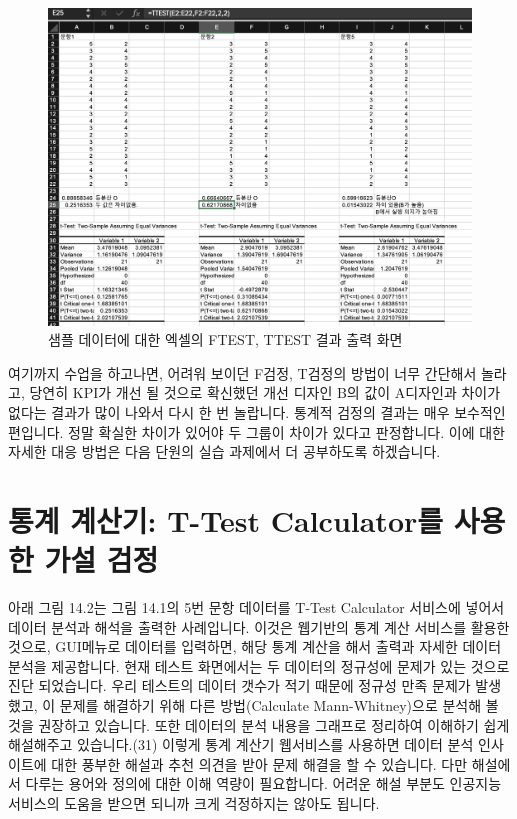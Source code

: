\documentclass[
  letterpaper,
]{book}
\begin{document}
\begin{figure}[H]

{\centering \includegraphics{img/fig28.png}

}

\caption{샘플 데이터에 대한 엑셀의 FTEST, TTEST 결과 출력 화면}

\end{figure}%

여기까지 수업을 하고나면, 어려워 보이던 F검정, T검정의 방법이 너무
간단해서 놀라고, 당연히 KPI가 개선 될 것으로 확신했던 개선 디자인 B의
값이 A디자인과 차이가 없다는 결과가 많이 나와서 다시 한 번 놀랍니다.
통계적 검정의 결과는 매우 보수적인 편입니다. 정말 확실한 차이가 있어야
두 그룹이 차이가 있다고 판정합니다. 이에 대한 자세한 대응 방법은 다음
단원의 실습 과제에서 더 공부하도록 하겠습니다.

\section{통계 계산기: T-Test Calculator를 사용한 가설
검정}\label{uxd1b5uxacc4-uxacc4uxc0b0uxae30-t-test-calculatoruxb97c-uxc0acuxc6a9uxd55c-uxac00uxc124-uxac80uxc815}

아래 그림 14.2는 그림 14.1의 5번 문항 데이터를 T-Test Calculator
서비스에 넣어서 데이터 분석과 해석을 출력한 사례입니다. 이것은 웹기반의
통계 계산 서비스를 활용한 것으로, GUI메뉴로 데이터를 입력하면, 해당 통계
계산을 해서 출력과 자세한 데이터 분석을 제공합니다. 현재 테스트
화면에서는 두 데이터의 정규성에 문제가 있는 것으로 진단 되었습니다. 우리
테스트의 데이터 갯수가 적기 때문에 정규성 만족 문제가 발생했고, 이
문제를 해결하기 위해 다른 방법(Calculate Mann-Whitney)으로 분석해 볼
것을 권장하고 있습니다. 또한 데이터의 분석 내용을 그래프로 정리하여
이해하기 쉽게 해설해주고 있습니다.(31) 이렇게 통계 계산기 웹서비스를
사용하면 데이터 분석 인사이트에 대한 풍부한 해설과 추천 의견을 받아 문제
해결을 할 수 있습니다. 다만 해설에서 다루는 용어와 정의에 대한 이해
역량이 필요합니다. 어려운 해설 부분도 인공지능 서비스의 도움을 받으면
되니까 크게 걱정하지는 않아도 됩니다.
\end{document}
